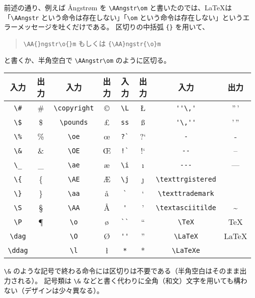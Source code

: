 前述の通り、例えば \AA{}ngstr\o{}m を \verb'\AAngstr\om' と書いたのでは、\LaTeX{}は「\verb'\AAngstr' という命令は存在しない」「\verb'\om' という命令は存在しない」というエラーメッセージを吐くだけである。
区切りの中括弧 \verb'{}' を用いて、
\begin{quote}
  \verb'\AA{}ngstr\o{}m'\hspc{+5.00pt} もしくは\hspc{+5.00pt} \verb'{\AA}ngstr{\o}m'
\end{quote}
と書くか、半角空白で \verb'\AA'\textvisiblespace\verb'ngstr\o'\textvisiblespace\verb'm' のように区切る。
\begin{longtable}{@{}cccccccc@{}}
    入力         & 出力    & 入力              & 出力         & 入力      & 出力 & 入力                    & 出力              \\ \toprule
    \verb'\#'    & \#      & \verb'\copyright' & \copyright{} & \verb'\L' & \L{}  & \verb|''\,'|           & ''\,'             \\
    \verb'\$'    & \$      & \verb'\pounds'    & \pounds{}    & \verb'ss' & \ss{} & \verb|'\,''|           & '\,''             \\
    \verb'\%'    & \%      & \verb'\oe'        & \oe{}        & \verb|?`| & {}?`  & \verb'-'               & {}-               \\
    \verb'\&'    & \&      & \verb'\OE'        & \OE{}        & \verb|!`| & {}!`  & \verb'--'              & {}--              \\
    \verb'\_'    & \_      & \verb'\ae'        & \ae{}        & \verb'\i' & \i    & \verb'---'             & ---               \\
    \verb'\{'    & \{      & \verb'\AE'        & \AE{}        & \verb'\j' & \j    & \verb'\texttrgistered' & \textregistered{} \\
    \verb'\}'    & \}      & \verb'\aa'        & \aa{}        & \verb|`|  & `     & \verb'\texttrademark'  & \texttrademark{}  \\
    \verb'\S'    & \S      & \verb'\AA'        & \AA{}        & \verb|'|  & '     & \verb'\textasciitilde' & \textasciitilde{} \\
    \verb'\P'    & \P      & \verb'\o'         & \o{}         & \verb|``| & ``    & \verb'\TeX'            & \TeX{}            \\
    \verb'\dag'  & \dag{}  & \verb'\O'         & \O{}         & \verb|''| & ''    & \verb'\LaTeX'          & \LaTeX{}          \\
    \verb'\ddag' & \ddag{} & \verb'\l'         & \l{}         & \verb|*|  & *     & \verb'\LaTeXe'         & \LaTeXe{}         \\
\end{longtable}
\verb'\&' のような記号で終わる命令には区切りは不要である（半角空白はそのまま出力される）。
記号類は \verb'\&' などと書く代わりに全角（和文）文字を用いても構わない（デザインは少々異なる）。\\

